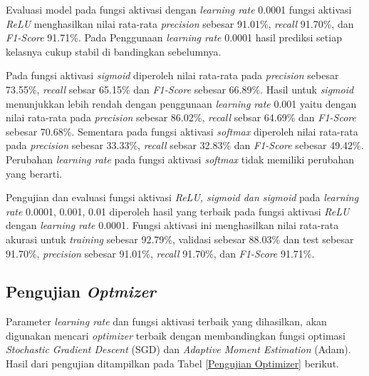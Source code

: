       Evaluasi model pada fungsi aktivasi dengan \textit{learning rate} 0.0001 fungsi aktivasi \textit{ReLU} menghasilkan nilai rata-rata \textit{precision} sebesar 91.01\%, \textit{recall} 91.70\%, dan\textit{ F1-Score} 91.71\%. Pada 
      Penggunaan \textit{learning rate} 0.0001 hasil prediksi setiap kelasnya cukup stabil di bandingkan sebelumnya. 
      
      Pada fungsi aktivasi \textit{sigmoid} diperoleh nilai rata-rata pada \textit{precision} sebesar 73.55\%, \textit{recall} sebsar 65.15\% dan\textit{ F1-Score} sebesar 66.89\%. Hasil untuk \textit{sigmoid} menunjukkan lebih rendah dengan penggunaan \textit{learning rate} 0.001 yaitu dengan nilai rata-rata pada \textit{precision} sebesar 86.02\%, \textit{recall} sebsar 64.69\% dan\textit{ F1-Score} sebesar 70.68\%. Sementara pada fungsi aktivasi \textit{softmax} diperoleh nilai rata-rata pada \textit{precision} sebesar 33.33\%, \textit{recall} sebsar 32.83\% dan\textit{ F1-Score} sebesar 49.42\%.
     Perubahan \textit{learning rate} pada fungsi aktivasi \textit{softmax} tidak memiliki perubahan yang berarti. 
     
     
     
    Pengujian dan evaluasi fungsi aktivasi \textit{ReLU, sigmoid dan sigmoid} pada \textit{learning rate} 0.0001, 0.001, 0.01 diperoleh hasil yang terbaik pada  fungsi aktivasi \textit{ReLU} dengan \textit{learning rate} 0.0001. Fungsi aktivasi ini menghasilkan nilai rata-rata  akurasi untuk \textit{training} sebesar 92.79\%, validasi sebesar 88.03\% dan test sebesar 91.70\%, \textit{precision} sebesar 91.01\%, \textit{recall} 91.70\%, dan\textit{ F1-Score} 91.71\%.

\subsection{Pengujian \textit{Optmizer}}

    Parameter \textit{learning rate} dan fungsi aktivasi terbaik yang dihasilkan, akan digunakan mencari \textit{optimizer} terbaik dengan membandingkan fungsi optimasi \textit{Stochastic Gradient Descent} (SGD) dan \textit{Adaptive Moment Estimation} (Adam). Hasil dari pengujian ditampilkan pada Tabel \ref{Pengujian Optimizer} berikut.

